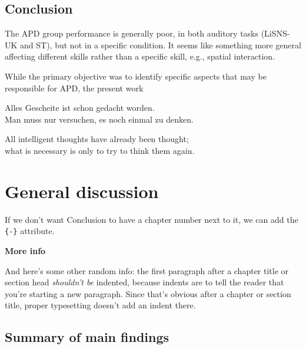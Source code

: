 \documentclass[a4paper, twoside]{templates/ociamthesis}
\begin{document}
\hypertarget{conclusion-2}{%
\section{Conclusion}\label{conclusion-2}}

The APD group performance is generally poor, in both auditory tasks (LiSNS-UK and ST), but not in a specific condition. It seems like something more general affecting different skills rather than a specific skill, e.g., spatial interaction.

While the primary objective was to identify specific aspects that may be responsible for APD, the present work

\clearpage

\begin{savequote}
Alles Gescheite ist schon gedacht worden.\\
Man muss nur versuchen, es noch einmal zu denken.

All intelligent thoughts have already been thought;\\
what is necessary is only to try to think them again.
\end{savequote}



\hypertarget{general-discussion}{%
\chapter*{General discussion}\label{general-discussion}}

If we don't want Conclusion to have a chapter number next to it, we can add the \texttt{\{-\}} attribute.

\textbf{More info}

And here's some other random info: the first paragraph after a chapter title or section head \emph{shouldn't be} indented, because indents are to tell the reader that you're starting a new paragraph. Since that's obvious after a chapter or section title, proper typesetting doesn't add an indent there.

\hypertarget{summary-of-main-findings}{%
\section*{Summary of main findings}\label{summary-of-main-findings}}
\end{document}
